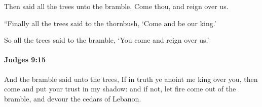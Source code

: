 			\begin{versebox}
					\item[BHS] 
					\item[ASV] Then said all the trees unto the bramble, Come thou, and reign over us.
					\item[NIV] “Finally all the trees said to the thornbush, ‘Come and be our king.’
					\item[NRSV] So all the trees said to the bramble, ‘You come and reign over us.’
			\end{versebox}

		\paragraph{Judges 9:15} %
			\label{JUDGES-9-15}

			And the bramble said unto the trees, If in truth ye anoint me king over you, then come and put your trust in my shadow: and if not, let fire come out of the bramble, and devour the cedars of Lebanon.

